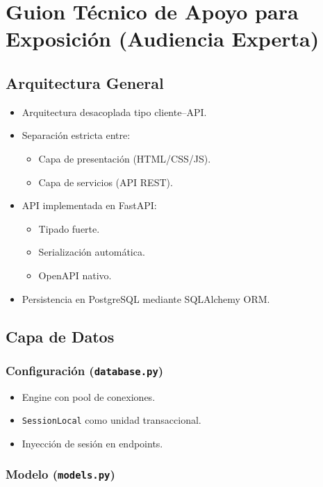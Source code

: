 \documentclass[12pt,letterpaper]{article}
\begin{document}
\section{Guion Técnico de Apoyo para Exposición (Audiencia Experta)}

\subsection{Arquitectura General}

\begin{itemize}
    \item Arquitectura desacoplada tipo cliente--API.
    \item Separación estricta entre:
    \begin{itemize}
        \item Capa de presentación (HTML/CSS/JS).
        \item Capa de servicios (API REST).
    \end{itemize}
    \item API implementada en FastAPI:
    \begin{itemize}
        \item Tipado fuerte.
        \item Serialización automática.
        \item OpenAPI nativo.
    \end{itemize}
    \item Persistencia en PostgreSQL mediante SQLAlchemy ORM.
\end{itemize}

\subsection{Capa de Datos}

\subsubsection{Configuración (\texttt{database.py})}

\begin{itemize}
    \item Engine con pool de conexiones.
    \item \texttt{SessionLocal} como unidad transaccional.
    \item Inyección de sesión en endpoints.
\end{itemize}

\subsubsection{Modelo (\texttt{models.py})}
\end{document}
